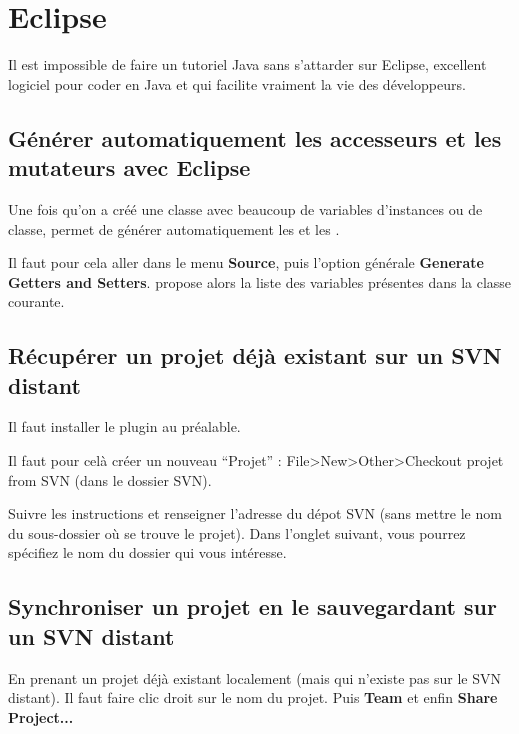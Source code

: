 \documentclass[a4paper,twoside]{article}
\begin{document}
\section{Eclipse}
Il est impossible de faire un tutoriel Java sans s'attarder sur Eclipse, excellent logiciel pour coder en Java et qui facilite vraiment la vie des développeurs.

\subsection{Générer automatiquement les accesseurs et les mutateurs avec Eclipse}
Une fois qu'on a créé une classe avec beaucoup de variables d'instances ou de classe,  permet de générer automatiquement les  et les . 

Il faut pour cela aller dans le menu \textbf{Source}, puis l'option générale \textbf{Generate Getters and Setters}.  propose alors la liste des variables présentes dans la classe courante.

\subsection{Récupérer un projet déjà existant sur un SVN distant}
Il faut installer le plugin  au préalable.

Il faut pour celà créer un nouveau ``Projet'' : File>New>Other>Checkout projet from SVN (dans le dossier SVN).

Suivre les instructions et renseigner l'adresse du dépot SVN (sans mettre le nom du sous-dossier où se trouve le projet). Dans l'onglet suivant, vous pourrez spécifiez le nom du dossier qui vous intéresse.

\subsection{Synchroniser un projet en le sauvegardant sur un SVN distant}
En prenant un projet déjà existant localement (mais qui n'existe pas sur le SVN distant). Il faut faire clic droit sur le nom du projet. Puis \textbf{Team} et enfin \textbf{Share Project...}

\printindex
\end{document}
